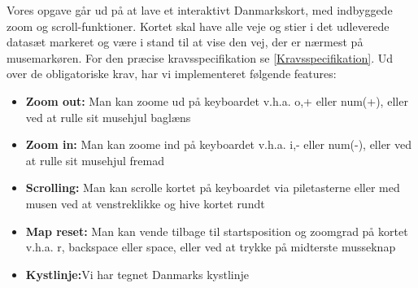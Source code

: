 Vores opgave går ud på at lave et interaktivt Danmarkskort, med indbyggede zoom og scroll-funktioner. Kortet skal have alle veje og stier i det udleverede datasæt markeret og være i stand til at vise den vej, der er nærmest på musemarkøren. For den præcise kravsspecifikation se \ref{Kravsspecifikation}.
\newline \newline
Ud over de obligatoriske krav, har vi implementeret følgende features:
\begin{itemize}
	\item{\textbf{Zoom out:} Man kan zoome ud på keyboardet v.h.a. o,+ eller num(+), eller ved at rulle sit musehjul baglæns}
	\item{\textbf{Zoom in:} Man kan zoome ind på keyboardet v.h.a. i,- eller num(-), eller ved at rulle sit musehjul fremad}
	\item{\textbf{Scrolling:} Man kan scrolle kortet på keyboardet via piletasterne eller med musen ved at venstreklikke og hive kortet rundt}
	\item{\textbf{Map reset:} Man kan vende tilbage til startsposition og zoomgrad på kortet v.h.a. r, backspace eller space, eller ved at trykke på midterste musseknap}
	\item{\textbf{Kystlinje:}Vi har tegnet Danmarks kystlinje}
\end{itemize}